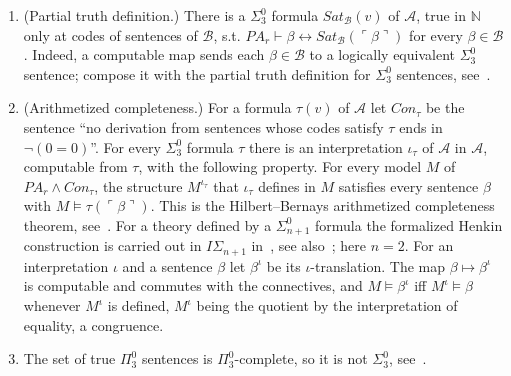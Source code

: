 \documentclass{amsart}  %
\numberwithin{equation}{section}
\theoremstyle{definition}
\theoremstyle{remark}
\begin{document}
\begin{enumerate}
\item (Partial truth definition.) There is a $\Sigma ^{0} _{3}$ formula $Sat _{\mathcal{B}} (v)$ of $\mathcal{A}$, true in $\mathbb{N}$ only at codes of sentences of $\mathcal{B}$, s.t. $PA _{r} \vdash \beta \leftrightarrow Sat _{\mathcal{B}} (\ulcorner \beta \urcorner)$ for every $\beta \in \mathcal{B}$. Indeed, a computable map sends each $\beta \in \mathcal{B}$ to a logically equivalent $\Sigma ^{0} _{3}$ sentence; compose it with the partial truth definition for $\Sigma ^{0} _{3}$ sentences, see~\cite[Chapter I, Section 1(d)]{cite_HajekPudlak1993Metamathematics}.
\item (Arithmetized completeness.) For a formula $\tau (v)$ of $\mathcal{A}$ let $Con _{\tau}$ be the sentence ``no derivation from sentences whose codes satisfy $\tau$ ends in $\neg (0 = 0)$''. For every $\Sigma ^{0} _{3}$ formula $\tau$ there is an interpretation $\iota _{\tau}$ of $\mathcal{A}$ in $\mathcal{A}$, computable from $\tau$, with the following property. For every model $M$ of $PA _{r} \land Con _{\tau}$, the structure $M ^{\iota _{\tau}}$ that $\iota _{\tau}$ defines in $M$ satisfies every sentence $\beta$ with $M \models \tau (\ulcorner \beta \urcorner)$. This is the Hilbert--Bernays arithmetized completeness theorem, see~\cite[Chapter I, Section 4]{cite_HajekPudlak1993Metamathematics}. For a theory defined by a $\Sigma ^{0} _{n+1}$ formula the formalized Henkin construction is carried out in $I \Sigma _{n+1}$ in~\cite{cite_McAloon1978Completeness}, see also~\cite[Fact 3.17]{cite_Blanck2021Hierarchical}; here $n = 2$. For an interpretation $\iota$ and a sentence $\beta$ let $\beta ^{\iota}$ be its $\iota$-translation. The map $\beta \mapsto \beta ^{\iota}$ is computable and commutes with the connectives, and $M \models \beta ^{\iota}$ iff $M ^{\iota} \models \beta$ whenever $M ^{\iota}$ is defined, $M ^{\iota}$ being the quotient by the interpretation of equality, a congruence.
\item The set of true $\Pi ^{0} _{3}$ sentences is $\Pi ^{0} _{3}$-complete, so it is not $\Sigma ^{0} _{3}$, see~\cite[Theorem 4.2.2 and Corollary 4.2.3]{cite_Soare}.
\end{enumerate}
\end{document}
